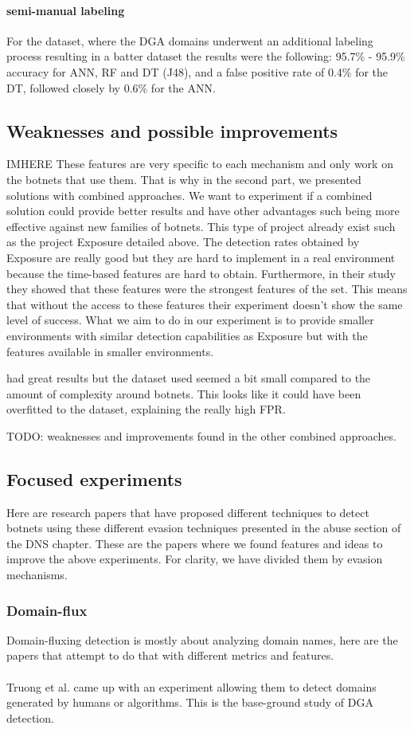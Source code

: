 \paragraph{semi-manual labeling}
For the dataset, where the DGA domains underwent an additional labeling process resulting in a batter dataset the results were the following: 95.7\% - 95.9\% accuracy for ANN, RF and DT (J48), and a false positive rate of 0.4\% for the DT, followed closely by 0.6\% for the ANN.


\subsection{Weaknesses and possible improvements}
IMHERE
These features are very specific to each mechanism and only work on the botnets that use them. That is why in the second part, we presented solutions with combined approaches. We want to experiment if a combined solution could provide better results and have other advantages such being more effective against new families of botnets. 
This type of project already exist such as the project Exposure detailed above. The detection rates obtained by Exposure are really good but they are hard to implement in a real environment because the time-based features are hard to obtain. Furthermore, in their study they showed that these features were the strongest features of the set. This means that without the access to these features their experiment doesn't show the same level of success. What we aim to do in our experiment is to provide smaller environments with similar detection capabilities as Exposure but with the features available in smaller environments. 

\cite{localbotnet} had great results but the dataset used seemed a bit small compared to the amount of complexity around botnets. This looks like it could have been overfitted to the dataset, explaining the really high FPR.

TODO: weaknesses and improvements found in the other combined approaches.
\subsection{Focused experiments}
Here are research papers that have proposed different techniques to detect botnets using these different evasion techniques presented in the abuse section of the DNS chapter. These are the papers where we found features and ideas to improve the above experiments. For clarity, we have divided them by evasion mechanisms.
\subsubsection{Domain-flux}
Domain-fluxing detection is mostly about analyzing domain names, here are the papers that attempt to do that with different metrics and features.\\
\\
Truong et al. \cite{dns-traffic} came up with an experiment allowing them to detect domains generated by humans or algorithms. This is the base-ground study of DGA detection.\\

